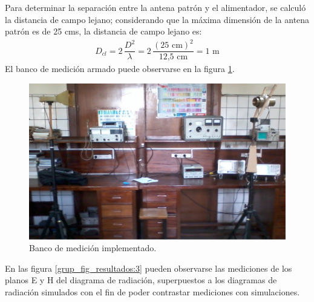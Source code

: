 Para determinar la separación entre la antena patrón y el alimentador, se calculó la distancia de campo lejano; considerando que la máxima dimensión de la antena patrón es de 25 cms, la distancia de campo lejano es:
\begin{align*}
D_{cl} = 2\,\dfrac{D^2}{\lambda} = 2\,\dfrac{\left(\text{25 cm}\right)^2}{\text{12,5 cm}} = 1\text{ m}
\end{align*}
El banco de medición armado puede observarse en la figura \ref{fig_resultados:20}.
\begin{figure}[H]
\centering
\includegraphics[scale = 0.32]{Figures/Resultados/resultados_20}
\caption{Banco de medición implementado.}
\label{fig_resultados:20}
\end{figure}
En las figura \ref{grup_fig_resultados:3} pueden observarse las mediciones de los planos E y H del diagrama de radiación, superpuestos a los diagramas de radiación simulados con el fin de poder contrastar mediciones con simulaciones.
